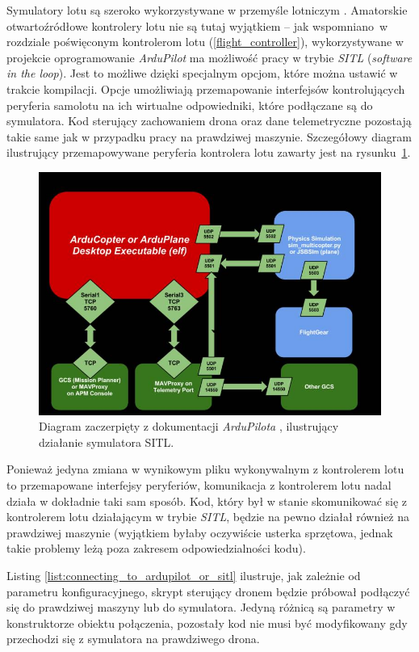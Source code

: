 Symulatory lotu są szeroko wykorzystywane w przemyśle lotniczym
\cite{simulation_and_simulators}. Amatorskie otwartoźródłowe kontrolery
lotu nie są tutaj wyjątkiem -- jak wspomniano~w rozdziale poświęconym
kontrolerom lotu (\ref{flight_controller}), wykorzystywane w projekcie 
oprogramowanie \textit{ArduPilot} ma możliwość pracy w trybie \textit{SITL}
(\textit{software in the loop}). Jest to możliwe dzięki specjalnym opcjom,
które można ustawić w trakcie kompilacji. Opcje umożliwiają przemapowanie
interfejsów kontrolujących peryferia samolotu na ich wirtualne odpowiedniki,
które podłączane są do symulatora. Kod sterujący zachowaniem drona 
oraz dane telemetryczne pozostają takie same jak w przypadku
pracy na prawdziwej maszynie. Szczegółowy diagram 
ilustrujący przemapowywane peryferia kontrolera lotu 
zawarty jest na rysunku~\ref{sitl_diagram}.

\begin{figure}[H]
	\centering
	\includegraphics[width=0.9\linewidth]{rys05/sitl.jpg}
    \caption{
        Diagram zaczerpięty z dokumentacji \textit{ArduPilota}
        \cite{ardupilot_sitl}, ilustrujący działanie symulatora SITL.
    }
	\label{sitl_diagram}
\end{figure}


Ponieważ jedyna zmiana w wynikowym pliku wykonywalnym
z kontrolerem lotu to przemapowane interfejsy peryferiów,
komunikacja z kontrolerem lotu nadal działa w dokładnie
taki sam sposób. Kod, który był w stanie skomunikować
się z kontrolerem lotu działającym w trybie \textit{SITL},
będzie na pewno działał również na prawdziwej maszynie
(wyjątkiem byłaby oczywiście usterka sprzętowa, jednak takie
problemy leżą poza zakresem odpowiedzialności kodu).

Listing \ref{list:connecting_to_ardupilot_or_sitl} ilustruje,
jak zależnie od parametru konfiguracyjnego, skrypt sterujący 
dronem będzie próbował podłączyć się do prawdziwej maszyny lub
do symulatora. Jedyną różnicą są parametry w konstruktorze
obiektu połączenia, pozostały kod nie musi być modyfikowany
gdy przechodzi się z symulatora na prawdziwego drona.

